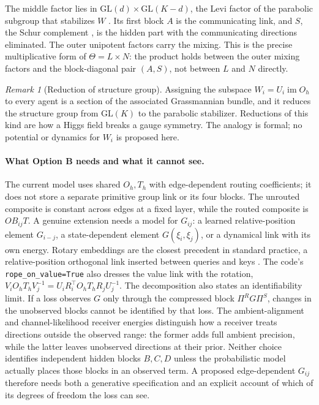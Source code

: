 \documentclass[11pt]{article}
\theoremstyle{definition}
\theoremstyle{remark}
\newtheorem{remark}[theorem]{Remark}
\providecommand{\GL}{\mathrm{GL}}
\providecommand{\im}{\operatorname{im}}
\providecommand{\cfg}[1]{{\small\texttt{#1}}}
\begin{document}
The middle factor lies in $\GL(d)\times\GL(K-d)$, the Levi factor of the parabolic subgroup that stabilizes $W$ \cite{links:humphreys1975}. Its first block $A$ is the communicating link, and $S$, the Schur complement \cite{links:zhang2005schur}, is the hidden part with the communicating directions eliminated. The outer unipotent factors carry the mixing. This is the precise multiplicative form of $\Theta=L\times N$: the product holds between the outer mixing factors and the block-diagonal pair $(A,S)$, not between $L$ and $N$ directly.

\begin{remark}[Reduction of structure group]
Assigning the subspace $W_i=U_i\im O_h$ to every agent is a section of the associated Grassmannian bundle, and it reduces the structure group from $\GL(K)$ to the parabolic stabilizer. Reductions of this kind are how a Higgs field breaks a gauge symmetry. The analogy is formal; no potential or dynamics for $W_i$ is proposed here.
\end{remark}

\paragraph{What Option B needs and what it cannot see.}
The current model uses shared $O_h,T_h$ with edge-dependent routing coefficients; it does not store a separate primitive group link or its four blocks. The unrouted composite is constant across edges at a fixed layer, while the routed composite is $OB_{ij}T$. A genuine extension needs a model for $G_{ij}$: a learned relative-position element $G_{i-j}$, a state-dependent element $G(\xi_i,\xi_j)$, or a dynamical link with its own energy. Rotary embeddings are the closest precedent in standard practice, a relative-position orthogonal link inserted between queries and keys \cite{links:su2021roformer}. The code's \cfg{rope\_on\_value=True} also dresses the value link with the rotation, $V_iO_hT_hV_j^{-1}=U_iR_i^\top O_hT_hR_jU_j^{-1}$. The decomposition also states an identifiability limit. If a loss observes $G$ only through the compressed block $\Pi^R G\Pi^S$, changes in the unobserved blocks cannot be identified by that loss. The ambient-alignment and channel-likelihood receiver energies distinguish how a receiver treats directions outside the observed range: the former adds full ambient precision, while the latter leaves unobserved directions at their prior. Neither choice identifies independent hidden blocks $B,C,D$ unless the probabilistic model actually places those blocks in an observed term. A proposed edge-dependent $G_{ij}$ therefore needs both a generative specification and an explicit account of which of its degrees of freedom the loss can see.
\end{document}
